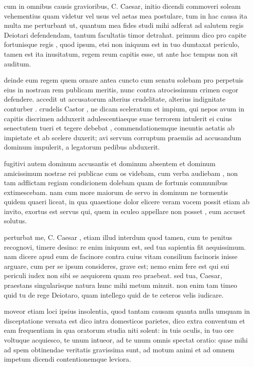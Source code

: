 
 cum in omnibus causis gravioribus, C. Caesar, initio dicendi commoveri soleam vehementius quam videtur vel usus vel aetas mea postulare, tum in hac causa ita multa me perturbant ut, quantum mea fides studi mihi adferat ad salutem regis Deiotari defendendam, tantum facultatis timor detrahat. primum dico pro capite fortunisque regis , quod ipsum, etsi non iniquum est in tuo dumtaxat periculo, tamen est ita inusitatum, regem reum capitis esse, ut ante hoc tempus non sit auditum.

 deinde eum regem quem ornare antea cuncto cum senatu solebam pro perpetuis eius in nostram rem publicam meritis, nunc contra atrocissimum crimen cogor defendere. accedit ut accusatorum alterius crudelitate, alterius indignitate conturber . crudelis Castor , ne dicam sceleratum et impium, qui nepos avum in capitis discrimen adduxerit adulescentiaeque suae terrorem intulerit ei cuius senectutem tueri et tegere debebat , commendationemque ineuntis aetatis ab impietate et ab scelere duxerit; avi servum corruptum praemiis ad accusandum dominum impulerit, a legatorum pedibus abduxerit.

 fugitivi autem dominum accusantis et dominum absentem et dominum amicissimum nostrae rei publicae cum os videbam, cum verba audiebam , non tam adflictam regiam condicionem dolebam quam de fortunis communibus extimescebam. nam cum more maiorum de servo in dominum ne tormentis quidem quaeri liceat, in qua quaestione dolor elicere veram vocem possit etiam ab invito, exortus est servus qui, quem in eculeo appellare non posset , eum accuset solutus.

 perturbat me, C. Caesar , etiam illud interdum quod tamen, cum te penitus recognovi, timere desino: re enim iniquum est, sed tua sapientia fit aequissimum. nam dicere apud eum de facinore contra cuius vitam consilium facinoris inisse arguare, cum per se ipsum consideres, grave est; nemo enim fere est qui sui periculi iudex non sibi se aequiorem quam reo praebeat. sed tua, Caesar, praestans singularisque natura hunc mihi metum minuit. non enim tam timeo quid tu de rege Deiotaro, quam intellego quid de te ceteros velis iudicare.

 moveor etiam loci ipsius insolentia, quod tantam causam quanta nulla umquam in disceptatione versata est dico intra domesticos parietes, dico extra conventum et eam frequentiam in qua oratorum studia niti solent: in tuis oculis, in tuo ore voltuque acquiesco, te unum intueor, ad te unum omnis spectat oratio: quae mihi ad spem obtinendae veritatis gravissima sunt, ad motum animi et ad omnem impetum dicendi contentionemque leviora.

